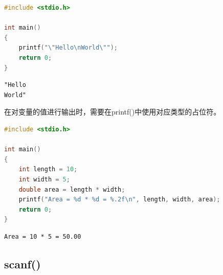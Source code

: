 
\begin{lstlisting}[language=C]
#include <stdio.h>

int main()
{
	printf("\"Hello\nWorld\"");
	return 0;
}
\end{lstlisting}

\begin{tcolorbox}
	\begin{verbatim}
"Hello
World"
	\end{verbatim}
\end{tcolorbox}

在对变量的值进行输出时，需要在printf()中使用对应类型的占位符。\\

\begin{table}[H]
	\centering
	\caption{占位符}
\end{table}

\vspace{0.5cm}


\begin{lstlisting}[language=C]
#include <stdio.h>

int main()
{
	int length = 10;
	int width = 5;
	double area = length * width;
	printf("Area = %d * %d = %.2f\n", length, width, area);
	return 0;
}
\end{lstlisting}

\begin{tcolorbox}
	\begin{verbatim}
Area = 10 * 5 = 50.00
	\end{verbatim}
\end{tcolorbox}

\vspace{0.5cm}

\subsection{scanf()}

